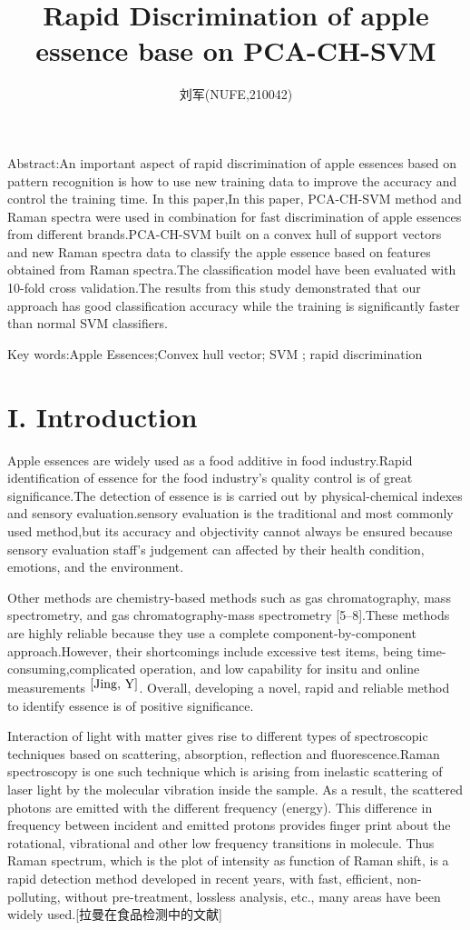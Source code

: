 \documentclass[a4paper]{article}
\author{刘军(NUFE,210042)}
\date{}
\title{Rapid Discrimination of apple essence base on PCA-CH-SVM  }
\begin{document}
\maketitle


Abstract:An important aspect of rapid discrimination of apple essences based on pattern recognition is how to use new training data to improve the accuracy and control the training time. In this paper,In this paper, PCA-CH-SVM method and Raman spectra were used in combination for fast discrimination of apple essences from different brands.PCA-CH-SVM built on a convex hull of support vectors and new Raman spectra data to classify the apple essence based on features obtained from Raman spectra.The classification model have been evaluated with 10-fold cross validation.The results from this study demonstrated that our approach has good classiﬁcation accuracy while the training is signiﬁcantly faster than normal SVM classiﬁers.


Key words:Apple Essences;Convex hull vector; SVM ; rapid discrimination
\section{I. Introduction}
Apple essences are widely used as a food additive in food industry.Rapid identification of essence for the food industry's quality control is of great significance.The detection of essence is is carried out by physical-chemical indexes and sensory evaluation.sensory evaluation is the traditional and most commonly used method,but its accuracy and objectivity cannot always be ensured because sensory evaluation staff’s judgement can affected by their health condition, emotions, and the environment.

Other methods  are chemistry-based methods such as gas chromatography, mass spectrometry, and gas chromatography-mass spectrometry [5–8].These methods are highly reliable because they use a complete component-by-component approach.However, their shortcomings include excessive test items, being time-consuming,complicated operation, and low capability for insitu and online measurements $^{\cite{Jing, Y}}$. Overall, developing a novel, rapid and reliable method to identify  essence is of positive significance.

Interaction of light with matter gives rise to different types of spectroscopic techniques based on scattering, absorption, reflection and fluorescence.Raman spectroscopy is one such technique which is arising from inelastic scattering of laser light by the molecular vibration inside the sample. As a result, the scattered photons are emitted with the different frequency (energy). This difference in frequency between incident and emitted protons provides finger print about the rotational, vibrational and other low frequency transitions in molecule. Thus Raman spectrum, which is the plot of intensity as function of Raman shift, is a rapid detection method developed in recent years, with fast, efficient, non-polluting, without pre-treatment, lossless analysis, etc., many areas have been widely used.[拉曼在食品检测中的文献]
\end{document}
